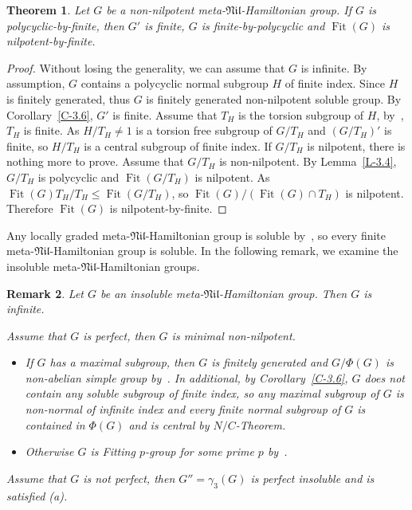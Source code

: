 \documentclass[11pt]{amsart}
\newtheorem{theorem}{Theorem}[section]
\newtheorem{remark}[theorem]{Remark}
\DeclareMathOperator{\Fit}{Fit}
\newcommand{\sub}{\leqslant}
\newcommand{\nil}{\mathfrak{Nil}}
\begin{document}
\begin{theorem}\label{T-3.9}
Let $G$ be a  non-nilpotent meta-$\mathfrak{Nil}$-Hamiltonian group. If $G$ is polycyclic-by-finite, then $G'$ is finite, $G$ is finite-by-polycyclic and $\Fit(G)$ is nilpotent-by-finite.
\end{theorem}
\begin{proof}
Without losing the generality, we can assume that $G$ is infinite. By assumption, $G$ contains a polycyclic normal subgroup $H$ of finite index. Since $H$ is finitely generated, thus $G$ is finitely generated non-nilpotent soluble group. By Corollary~\ref{C-3.6}, $G'$ is finite. Assume that $T_H$ is the torsion subgroup of $H$, by~\cite[2.49(ii)]{DKS}, $T_H$ is finite. As $H/T_H\neq 1$ is a torsion free subgroup of $G/T_H$ and $(G/T_H)'$ is finite, so $H/T_H$ is a central subgroup of finite index. If $G/T_H$ is nilpotent, there is nothing more to prove. Assume that $G/T_H$ is non-nilpotent. By Lemma~\ref{L-3.4}, $G/T_H$ is polycyclic and $\Fit(G/T_H)$ is nilpotent. As $\Fit(G)T_H/T_H\sub\Fit(G/T_H)$, so $\Fit(G)/(\Fit(G)\cap T_H)$ is nilpotent. Therefore $\Fit(G)$ is nilpotent-by-finite.
\end{proof}

Any locally graded meta-$\nil$-Hamiltonian group is soluble by~\cite[Lemma 5.11]{DM}, so every finite meta-$\nil$-Hamiltonian group is soluble. In the following remark, we examine the insoluble meta-$\nil$-Hamiltonian groups.

\begin{remark} \label{K-3.13}
Let $G$ be an insoluble meta-$\nil$-Hamiltonian group. Then $G$ is infinite.

\item[(a)] Assume that $G$ is perfect, then $G$ is minimal non-nilpotent.
\begin{itemize}
\item[(a-i)] If $G$ has a maximal subgroup, then $G$ is finitely generated and $G/\Phi(G)$ is non-abelian simple group by~\cite[propositions 5.8, 5,9]{DM}. In additional, by Corollary~\ref{C-3.6}, $G$ does not contain any soluble subgroup of finite index, so any maximal subgroup of $G$ is non-normal of infinite index and every finite normal subgroup of $G$ is contained in $\Phi(G)$ and is central by $N/C$-Theorem.

\item[(a-ii)] Otherwise $G$ is Fitting $p$-group for some prime $p$ by~\cite[Theorem 3.3 (i) and (ii)]{Smith}. 
\end{itemize}

\item[(b)] Assume that $G$ is not perfect, then $G''=\gamma_3(G)$ is perfect insoluble and is satisfied (a).
\end{remark}
\end{document}
